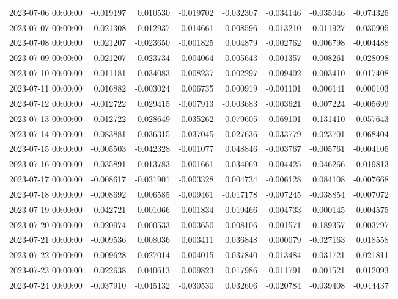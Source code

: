 \begin{tabular}{lrrrrrrr}
2023-07-06 00:00:00 & -0.019197 & 0.010530 & -0.019702 & -0.032307 & -0.034146 & -0.035046 & -0.074325 \\
2023-07-07 00:00:00 & 0.021308 & 0.012937 & 0.014661 & 0.008596 & 0.013210 & 0.011927 & 0.030905 \\
2023-07-08 00:00:00 & 0.021207 & -0.023650 & -0.001825 & 0.004879 & -0.002762 & 0.006798 & -0.004488 \\
2023-07-09 00:00:00 & -0.021207 & -0.023734 & -0.004064 & -0.005643 & -0.001357 & -0.008261 & -0.028098 \\
2023-07-10 00:00:00 & 0.011181 & 0.034083 & 0.008237 & -0.002297 & 0.009402 & 0.003410 & 0.017408 \\
2023-07-11 00:00:00 & 0.016882 & -0.003024 & 0.006735 & 0.000919 & -0.001101 & 0.006141 & 0.000103 \\
2023-07-12 00:00:00 & -0.012722 & 0.029415 & -0.007913 & -0.003683 & -0.003621 & 0.007224 & -0.005699 \\
2023-07-13 00:00:00 & -0.012722 & -0.028649 & 0.035262 & 0.079605 & 0.069101 & 0.131410 & 0.057643 \\
2023-07-14 00:00:00 & -0.083881 & -0.036315 & -0.037045 & -0.027636 & -0.033779 & -0.023701 & -0.068404 \\
2023-07-15 00:00:00 & -0.005503 & -0.042328 & -0.001077 & 0.048846 & -0.003767 & -0.005761 & -0.004105 \\
2023-07-16 00:00:00 & -0.035891 & -0.013783 & -0.001661 & -0.034069 & -0.004425 & -0.046266 & -0.019813 \\
2023-07-17 00:00:00 & -0.008617 & -0.031901 & -0.003328 & 0.004734 & -0.006128 & 0.084108 & -0.007668 \\
2023-07-18 00:00:00 & -0.008692 & 0.006585 & -0.009461 & -0.017178 & -0.007245 & -0.038854 & -0.007072 \\
2023-07-19 00:00:00 & 0.042721 & 0.001066 & 0.001834 & 0.019466 & -0.004733 & 0.000145 & 0.004575 \\
2023-07-20 00:00:00 & -0.020974 & 0.000533 & -0.003650 & 0.008106 & 0.001571 & 0.189357 & 0.003797 \\
2023-07-21 00:00:00 & -0.009536 & 0.008036 & 0.003411 & 0.036848 & 0.000079 & -0.027163 & 0.018558 \\
2023-07-22 00:00:00 & -0.009628 & -0.027014 & -0.004015 & -0.037840 & -0.013484 & -0.031721 & -0.021811 \\
2023-07-23 00:00:00 & 0.022638 & 0.040613 & 0.009823 & 0.017986 & 0.011791 & 0.001521 & 0.012093 \\
2023-07-24 00:00:00 & -0.037910 & -0.045132 & -0.030530 & 0.032606 & -0.020784 & -0.039408 & -0.044437 \\

\end{tabular}
